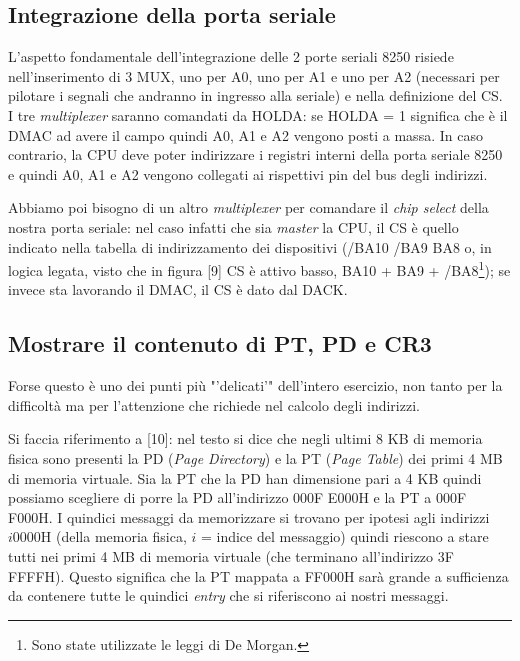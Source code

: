 \subsection{Integrazione della porta seriale}

L'aspetto fondamentale dell'integrazione delle 2 porte seriali 8250 risiede nell'inserimento di 3 MUX, uno per A0, uno per A1 e uno per A2 (necessari per pilotare i segnali che andranno in ingresso alla seriale) e nella definizione del CS. I tre \textit{multiplexer} saranno comandati da HOLDA: se HOLDA = 1 significa che è il DMAC ad avere il campo quindi A0, A1 e A2 vengono posti a massa. In caso contrario, la CPU deve poter indirizzare i registri interni della porta seriale 8250 e quindi A0, A1 e A2 vengono collegati ai rispettivi pin del bus degli indirizzi.

Abbiamo poi bisogno di un altro \textit{multiplexer} per comandare il \textit{chip select} della nostra porta seriale: nel caso infatti che sia \textit{master} la CPU, il CS è quello indicato nella tabella di indirizzamento dei dispositivi (/BA10 /BA9 BA8 o, in logica legata, visto che in figura [9] CS è attivo basso, BA10 + BA9 + /BA8\footnote{Sono state utilizzate le leggi di De Morgan.}); se invece sta lavorando il DMAC, il CS è dato dal DACK.

\subsection{Mostrare il contenuto di PT, PD e CR3}

Forse questo è uno dei punti più "'delicati'" dell'intero esercizio, non tanto per la difficoltà ma per l'attenzione che richiede nel calcolo degli indirizzi.


Si faccia riferimento a [10]: nel testo si dice che negli ultimi 8 KB di memoria fisica sono presenti la PD (\textit{Page Directory}) e la PT (\textit{Page Table}) dei primi 4 MB di memoria virtuale. Sia la PT che la PD han dimensione pari a 4 KB quindi possiamo scegliere di porre la PD all'indirizzo 000F E000H e la PT a 000F F000H. I quindici messaggi da memorizzare si trovano per ipotesi agli indirizzi $i0000$H (della memoria fisica, $i$ = indice del messaggio) quindi riescono a stare tutti nei primi 4 MB di memoria virtuale (che terminano all'indirizzo 3F FFFFH). Questo significa che la PT mappata a FF000H sarà grande a sufficienza da contenere tutte le quindici \textit{entry} che si riferiscono ai nostri messaggi.

